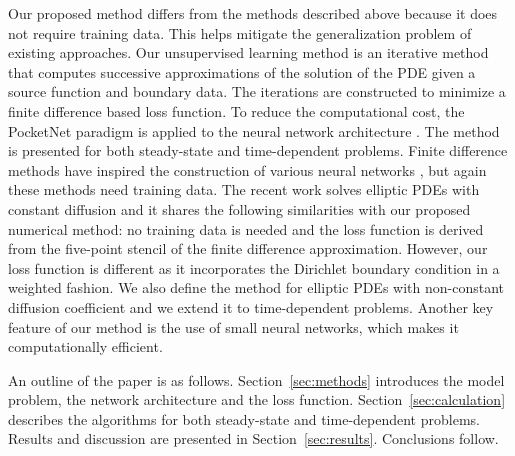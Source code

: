 \documentclass[preprint,12pt]{elsarticle}
\begin{document}
Our proposed method differs from the methods described above because it does not require  training data. This helps mitigate the generalization problem of existing approaches. Our unsupervised learning method  is an iterative method that computes successive approximations of the solution of the PDE given a source function and boundary data. The iterations are constructed to  minimize a finite difference based loss function. To reduce the computational cost, the PocketNet paradigm is applied to the neural network architecture \cite{celaya2022pocketnet}. The method is presented for both steady-state and time-dependent problems. Finite difference methods have inspired the construction of various neural networks \cite{chiu2022can,Lim2022}, but again these methods need training data.  The recent work \cite{Zhao2023} solves elliptic PDEs with constant diffusion and it shares the following similarities with our proposed numerical method: no training data is needed and the  loss function is derived from the five-point stencil of the finite difference approximation.  However, our loss function is different as it incorporates the Dirichlet boundary condition in a weighted fashion. We also define the method for elliptic PDEs with non-constant diffusion coefficient and we extend it to time-dependent problems.  Another key feature of our method is the use of small neural networks, which makes it computationally efficient.

An outline of the paper is as follows. Section~\ref{sec:methods} introduces the model problem, the network architecture and the loss function.   Section~\ref{sec:calculation} describes the algorithms for both steady-state and time-dependent problems. Results and discussion are presented in Section~\ref{sec:results}. Conclusions follow. 

%
%
\end{document}

